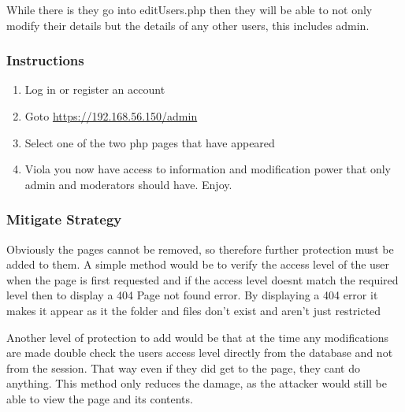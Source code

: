 \documentclass[titlepage]{article}
\begin{document}
      While there is they go into editUsers.php then they will be able to not only modify their details but the details of any other users, this includes admin.

      \subsubsection{Instructions} %
      \label{ssub:broken_access_controls_instructions}
      
      \begin{enumerate}
         \item Log in or register an account
         \item Goto \url{https://192.168.56.150/admin}
         \item Select one of the two php pages that have appeared
         \item Viola you now have access to information and modification power that only admin and moderators should have. Enjoy.
      \end{enumerate}


      \subsubsection{Mitigate Strategy} %
      \label{ssub:broken_access_controls_mitigate_strategy}
      
      Obviously the pages cannot be removed, so therefore further protection must be added to them. A simple method would be to verify the access level of the user when the page is first requested and if the access level doesnt match the required level then to display a 404 Page not found error. By displaying a 404 error it makes it appear as it the folder and files don't exist and aren't just restricted

      Another level of protection to add would be that at the time any modifications are made double check the users access level directly from the database and not from the session. That way even if they did get to the page, they cant do anything. This method only reduces the damage, as the attacker would still be able to view the page and its contents. 



\end{document}
